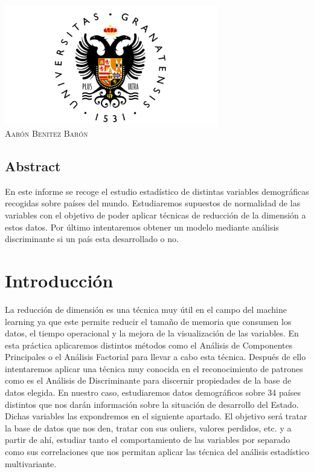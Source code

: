 \begin{titlepage}
\includegraphics[width=0.7\textwidth]{UGR-Logo.png}\\[1.5cm] %
\textsc{\large Aarón Benitez Barón}\\[0.5cm]


 

\vfill %

\end{titlepage}

\tableofcontents
\newpage

\begin{centering}
\section*{Abstract}
En este informe se recoge el estudio estadístico de distintas variables demográficas recogidas sobre países del mundo. Estudiaremos supuestos de normalidad de las variables con el objetivo de poder aplicar técnicas de reducción de la dimensión a estos datos.
Por último intentaremos obtener un modelo mediante análisis discriminante si un país esta desarrollado o no.
\end{centering}

\section{Introducción}
La reducción de dimensión es una técnica muy útil en el campo del machine learning ya que este permite reducir el tamaño de memoria que consumen los datos, el tiempo operacional y la mejora de la visualización de las variables. En esta práctica aplicaremos distintos métodos como el Análisis de Componentes Principales o el Análisis Factorial para llevar a cabo esta técnica.
Después de ello intentaremos aplicar una técnica muy conocida en el reconocimiento de patrones como es el Análisis de Discriminante para discernir propiedades de la base de datos elegida.
En nuestro caso, estudiaremos datos demográficos sobre 34 países distintos que nos darán información sobre la situación de desarrollo del Estado. Dichas variables las expondremos en el siguiente apartado.
El objetivo será tratar la base de datos que nos den, tratar con sus ouliers, valores perdidos, etc. y a partir de ahí, estudiar tanto el comportamiento de las variables por separado como sus correlaciones que nos permitan aplicar las técnica del análisis estadístico multivariante.


